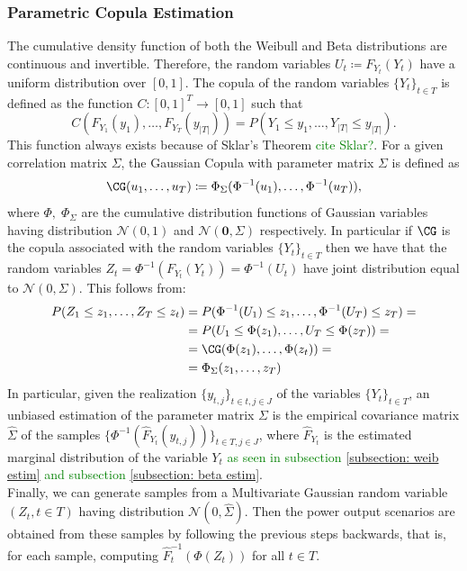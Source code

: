 \subsubsection{Parametric Copula Estimation}
The cumulative density function of both the Weibull and Beta distributions are continuous and invertible. Therefore, the random variables \( U_t \coloneqq F_{Y_t}(Y_t) \) have a uniform distribution over \([0,1]\). The copula of the random variables \(\{Y_t\}_{t \in T}\) is defined as the function \(C: [0,1]^T \to [0,1]\) such that 
\begin{equation}
C(F_{Y_1}(y_1), \ldots, F_{Y_T}(y_{|T|})) = P(Y_1 \leq y_1, \ldots, Y_{|T|} \leq y_{|T|}).
\end{equation}
This function always exists because of Sklar's Theorem \textcolor{green}{cite Sklar?}. For a given correlation matrix \(\Sigma\), the Gaussian Copula with parameter matrix \(\Sigma\) is defined as 
\[\CG(u_1,\ldots,u_{T}) \coloneqq \Phi_{\Sigma}(\Phi^{-1}(u_1),\ldots, \Phi^{-1}(u_T)),\] 
where \(\Phi,\; \Phi_{\Sigma}\) are the cumulative distribution functions of Gaussian variables having distribution \(\mathcal{N}(0,1)\) and \( \mathcal{N}(\mathbf{0},\Sigma)\) respectively. 
In particular if \(\CG\) is the copula associated with the random variables \(\{Y_t\}_{t \in T}\) then we have that the random variables \(Z_t = \Phi^{-1}(F_{Y_t}(Y_t)) = \Phi^{-1}(U_t)\) have joint distribution equal to \(\mathcal{N}(0, \Sigma)\). This follows from: \\
\begin{align*}
P(Z_1 \leq z_1, \ldots, Z_T \leq z_t) &= P(\Phi^{-1}(U_1) \leq z_1, \ldots, \Phi^{-1}(U_T) \leq z_T) = \\
&= P(U_1 \leq \Phi(z_1), \ldots, U_T \leq \Phi(z_T)) = \\
&= \CG(\Phi(z_1), \ldots, \Phi(z_t)) =  \\
&= \Phi_{\Sigma}(z_1, \ldots, z_T)
\end{align*}
In particular, given the realization \(\{y_{t,j}\}_{t \in t, j \in J}\) of the variables \(\{Y_t\}_{t \in T}\), an unbiased estimation of the parameter matrix \(\Sigma\) is the empirical covariance matrix \(\hat \Sigma\) of the samples \(\{\Phi^{-1}(\hat{F}_{Y_t}(y_{t,j}))\}_{t\in T, j \in J}\), where \(\hat{F}_{Y_t}\) is the estimated marginal distribution of the variable \(Y_t\) \textcolor{green}{as seen in subsection \ref{subsection: weib estim} and subsection \ref{subsection: beta estim}}.\\


Finally, we can generate samples from a Multivariate Gaussian random variable \((Z_{t}, t \in T)\) having distribution \(\mathcal{N}(0, \hat \Sigma)\).  Then the power output scenarios are obtained from these samples by following the previous steps backwards, that is, for each sample, computing \(\hat F_{t}^{-1}(\Phi(Z_{t}))\) for all \(t\in T\). \\

